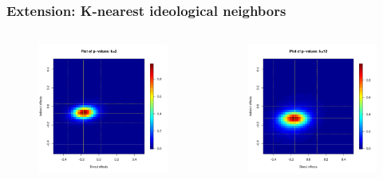 \documentclass{beamer}
\begin{document}
\begin{frame}
\frametitle{Extension: K-nearest ideological neighbors}
\vspace{-10mm}
\begin{columns}[c]

\begin{figure}
\centering
\includegraphics[trim = 11mm 0mm 9mm 0mm, clip, scale=0.39]{pval_plot_coppock_ideo_3nn.pdf}
\end{figure}

\begin{figure}
\centering
\includegraphics[trim = 11mm 0mm 9mm 0mm, clip, scale=0.39]{pval_plot_coppock_ideo_12nn.pdf}
\end{figure}


\end{columns}
\end{frame}
\end{document}
